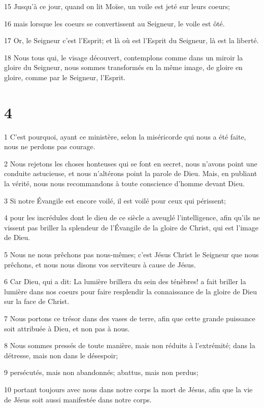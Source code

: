 \par 15 Jusqu'à ce jour, quand on lit Moïse, un voile est jeté sur leurs coeurs;
\par 16 mais lorsque les coeurs se convertissent au Seigneur, le voile est ôté.
\par 17 Or, le Seigneur c'est l'Esprit; et là où est l'Esprit du Seigneur, là est la liberté.
\par 18 Nous tous qui, le visage découvert, contemplons comme dans un miroir la gloire du Seigneur, nous sommes transformés en la même image, de gloire en gloire, comme par le Seigneur, l'Esprit.

\chapter{4}

\par 1 C'est pourquoi, ayant ce ministère, selon la miséricorde qui nous a été faite, nous ne perdons pas courage.
\par 2 Nous rejetons les choses honteuses qui se font en secret, nous n'avons point une conduite astucieuse, et nous n'altérons point la parole de Dieu. Mais, en publiant la vérité, nous nous recommandons à toute conscience d'homme devant Dieu.
\par 3 Si notre Évangile est encore voilé, il est voilé pour ceux qui périssent;
\par 4 pour les incrédules dont le dieu de ce siècle a aveuglé l'intelligence, afin qu'ils ne vissent pas briller la splendeur de l'Évangile de la gloire de Christ, qui est l'image de Dieu.
\par 5 Nous ne nous prêchons pas nous-mêmes; c'est Jésus Christ le Seigneur que nous prêchons, et nous nous disons vos serviteurs à cause de Jésus.
\par 6 Car Dieu, qui a dit: La lumière brillera du sein des ténèbres! a fait briller la lumière dans nos coeurs pour faire resplendir la connaissance de la gloire de Dieu sur la face de Christ.
\par 7 Nous portons ce trésor dans des vases de terre, afin que cette grande puissance soit attribuée à Dieu, et non pas à nous.
\par 8 Nous sommes pressés de toute manière, mais non réduits à l'extrémité; dans la détresse, mais non dans le désespoir;
\par 9 persécutés, mais non abandonnés; abattus, mais non perdus;
\par 10 portant toujours avec nous dans notre corps la mort de Jésus, afin que la vie de Jésus soit aussi manifestée dans notre corps.
